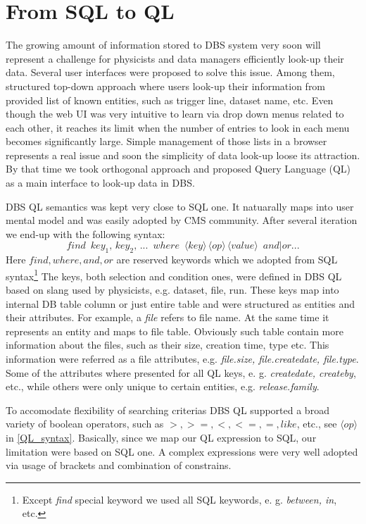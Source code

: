 \documentclass[a4paper]{jpconf}
\begin{document}
\section{From SQL to QL}
The growing amount of information stored to DBS system very soon
will represent a challenge for physicists and data managers efficiently
look-up their data. Several user interfaces were proposed to solve this issue.
Among them, structured top-down approach where users look-up their
information from provided list of known entities, such as
trigger line, dataset name, etc.
Even though the web UI
was very intuitive to learn via drop down menus related to each
other, it reaches its limit when the number of entries to look in each menu
becomes significantly large.
Simple management of those lists in a browser represents a real issue and
soon the simplicity of data look-up loose its attraction. By that time
we took orthogonal approach and proposed Query Language (QL) as
a main interface to look-up data in DBS.

DBS QL semantics was kept very close to SQL one. It natuarally
maps into user mental model and was easily adopted by CMS
community. After several iteration we end-up with the following syntax:
\[
find\,\,\,
key_1,\, key_2,\, ...\,\,\, where\,\,\,
\langle key\rangle\, 
\langle op\rangle\, 
\langle value\rangle \,\,\, and|or ...
\label{QL_syntax}
\]
Here $find, where, and, or$ are reserved keywords
which we adopted from SQL syntax\footnote{Except {\it find} special
keyword we used all SQL keywords, e. g. {\it between, in}, etc.}
The keys, both selection and condition ones, were defined
in DBS QL based on slang used by physicists, e.g. dataset, file, run. 
These keys map into internal DB table column or just entire table and 
were structured as entities and their attributes. For example,
a {\it file} refers to file name. At the same time it represents an
entity and maps to file table. Obviously such table
contain more information about the files, such as their size, creation time,
type etc. This information were referred as a file attributes, e.g.
{\it file.size, file.createdate, file.type}. Some of the attributes
where presented for all QL keys, e. g. {\it createdate, createby}, etc.,
while others were only unique to certain entities, e.g. {\it release.family}.

To accomodate flexibility of searching criterias DBS QL supported a
broad variety of boolean operators, such as $>, >=, <, <=, =, like$, etc.,
see $\langle op\rangle$ in \ref{QL_syntax}. Basically,
since we map our QL expression to SQL, our limitation were based
on SQL one. A complex expressions were very well adopted via
usage of brackets and combination of constrains.
\end{document}
